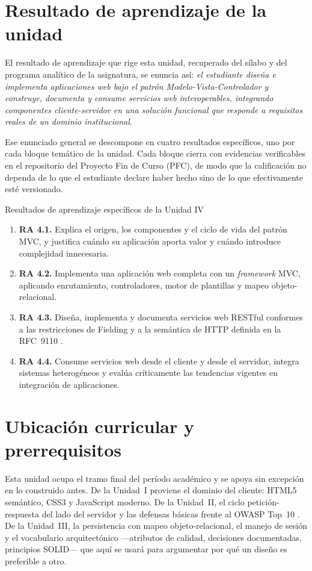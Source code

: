 \documentclass[11pt,a4paper,openany]{book}
\begin{document}
\section*{Resultado de aprendizaje de la unidad}
El resultado de aprendizaje que rige esta unidad, recuperado del sílabo y del programa analítico de la asignatura, se enuncia así: \emph{el estudiante diseña e implementa aplicaciones web bajo el patrón Modelo-Vista-Controlador y construye, documenta y consume servicios web interoperables, integrando componentes cliente-servidor en una solución funcional que responde a requisitos reales de un dominio institucional}.

Ese enunciado general se descompone en cuatro resultados específicos, uno por cada bloque temático de la unidad. Cada bloque cierra con evidencias verificables en el repositorio del Proyecto Fin de Curso (PFC), de modo que la calificación no dependa de lo que el estudiante declare haber hecho sino de lo que efectivamente esté versionado.

\begin{cajadefinicion}{Resultados de aprendizaje específicos de la Unidad IV}
	\begin{enumerate}
		\item \textbf{RA 4.1.} Explica el origen, los componentes y el ciclo de vida del patrón MVC, y justifica cuándo su aplicación aporta valor y cuándo introduce complejidad innecesaria.
		\item \textbf{RA 4.2.} Implementa una aplicación web completa con un \emph{framework} MVC, aplicando enrutamiento, controladores, motor de plantillas y mapeo objeto-relacional.
		\item \textbf{RA 4.3.} Diseña, implementa y documenta servicios web RESTful conformes a las restricciones de Fielding \cite{fielding2000rest} y a la semántica de HTTP definida en la RFC~9110 \cite{rfc9110}.
		\item \textbf{RA 4.4.} Consume servicios web desde el cliente y desde el servidor, integra sistemas heterogéneos y evalúa críticamente las tendencias vigentes en integración de aplicaciones.
	\end{enumerate}
\end{cajadefinicion}

\section*{Ubicación curricular y prerrequisitos}
Esta unidad ocupa el tramo final del período académico y se apoya sin excepción en lo construido antes. De la Unidad~I proviene el dominio del cliente: HTML5 semántico, CSS3 y JavaScript moderno. De la Unidad~II, el ciclo petición-respuesta del lado del servidor y las defensas básicas frente al OWASP Top~10 \cite{owasp2021top10}. De la Unidad~III, la persistencia con mapeo objeto-relacional, el manejo de sesión y el vocabulario arquitectónico ---atributos de calidad, decisiones documentadas, principios SOLID--- que aquí se usará para argumentar por qué un diseño es preferible a otro.
\end{document}
